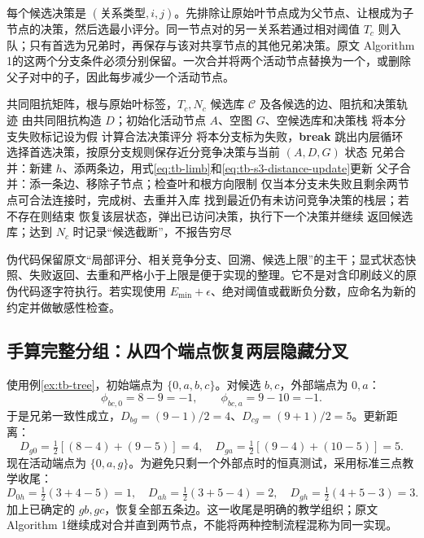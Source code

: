 每个候选决策是 $(\text{关系类型},i,j)$。先排除让原始叶节点成为父节点、让根成为子节点的决策，然后选最小评分。同一节点对的另一关系若通过相对阈值 $T_c$ 则入队；只有首选为兄弟时，再保存与该对共享节点的其他兄弟决策。原文 Algorithm 1的这两个分支条件必须分别保留。一次合并将两个活动节点替换为一个，或删除父子对中的子，因此每步减少一个活动节点。

\begin{algorithm}[htbp]
\caption{S3：回溯分组的状态级重述（平均、方向及零值约定须显式记录）}
\begin{algorithmic}[1]
\Require 共同阻抗矩阵，根与原始叶标签，$T_c,N_c$
\Ensure 候选库 $\mathcal C$ 及各候选的边、阻抗和决策轨迹
\State 由共同阻抗构造 $D$；初始化活动节点 $A$、空图 $G$、空候选库和决策栈
\State 将本分支失败标记设为假
\State 计算合法决策评分
\State 将本分支标为失败，\textbf{break} 跳出内层循环
\EndIf
\State 选择首选决策，按原分支规则保存近分竞争决策与当前 $(A,D,G)$ 状态
\State 兄弟合并：新建 $h$、添两条边，用式\eqref{eq:tb-limb}和\eqref{eq:tb-s3-distance-update}更新
\State 父子合并：添一条边、移除子节点；检查叶和根方向限制
\EndWhile
\State 仅当本分支未失败且剩余两节点可合法连接时，完成树、去重并入库
\State 找到最近仍有未访问竞争决策的栈层；若不存在则结束
\State 恢复该层状态，弹出已访问决策，执行下一个决策并继续
\EndWhile
\State 返回候选库；达到 $N_c$ 时记录“候选截断”，不报告穷尽
\end{algorithmic}
\end{algorithm}
伪代码保留原文“局部评分、相关竞争分支、回溯、候选上限”的主干；显式状态快照、失败返回、去重和严格小于上限是便于实现的整理。它不是对含印刷歧义的原伪代码逐字符执行。若实现使用 $E_{\min}+\epsilon$、绝对阈值或截断负分数，应命名为新的约定并做敏感性检查。

\subsection{手算完整分组：从四个端点恢复两层隐藏分叉}
使用例\ref{ex:tb-tree}，初始端点为 $\{0,a,b,c\}$。对候选 $b,c$，外部端点为 $0,a$：
\begin{equation}
 \phi_{bc,0}=8-9=-1,\qquad \phi_{bc,a}=9-10=-1.
\end{equation}
于是兄弟一致性成立，$D_{bg}=(9-1)/2=4$、$D_{cg}=(9+1)/2=5$。更新距离：
\begin{equation}
 D_{g0}=\tfrac12[(8-4)+(9-5)]=4,\quad
 D_{ga}=\tfrac12[(9-4)+(10-5)]=5.
\end{equation}
现在活动端点为 $\{0,a,g\}$。为避免只剩一个外部点时的恒真测试，采用标准三点教学收尾：
\begin{equation}
 D_{0h}=\tfrac12(3+4-5)=1,\quad
 D_{ah}=\tfrac12(3+5-4)=2,\quad
 D_{gh}=\tfrac12(4+5-3)=3.
\end{equation}
加上已确定的 $gb,gc$，恢复全部五条边。这一收尾是明确的教学组织；原文 Algorithm 1继续成对合并直到两节点，不能将两种控制流程混称为同一实现。


